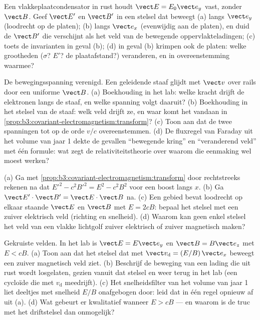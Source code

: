 \begin{exercise}[$\star$]\label{exo:b3:covariant-electromagnetism:4}
Een vlakkeplaatcondensator in rust houdt $\vect E = E_0\vect e_y$ vast,
zonder $\vect B$. Geef $\vect E'$ en $\vect B'$ in een stelsel dat
beweegt (a) langs $\vect e_y$ (loodrecht op de platen); (b) langs $\vect
e_x$ (evenwijdig aan de platen), en duid de $\vect B'$ die verschijnt als
het veld van de bewegende oppervlakteladingen; (c) toets de invarianten in
geval (b); (d) in geval (b) krimpen ook de platen: welke grootheden
($\sigma$? $E'$? de plaatafstand?) veranderen, en in overeenstemming
waarmee?
\end{exercise}

\begin{exercise}[$\star\star$]\label{exo:b3:covariant-electromagnetism:5}
De bewegingsspanning verenigd. Een geleidende staaf glijdt met $\vect v$
over rails door een uniforme $\vect B$. (a) Boekhouding in het lab: welke
kracht drijft de elektronen langs de staaf, en welke spanning volgt
daaruit? (b) Boekhouding in het stelsel van de staaf: welk veld drijft ze,
en waar komt het vandaan in
\cref{prop:b3:covariant-electromagnetism:transform}? (c) Toon aan dat de
twee spanningen tot op de orde $v/c$ overeenstemmen. (d) De fluxregel van
Faraday uit het volume van jaar 1 dekte de gevallen ``bewegende kring'' en
``veranderend veld'' met één formule: wat zegt de relativiteitstheorie
over waarom die eenmaking wel moest werken?
\end{exercise}

\begin{exercise}[$\star\star$]\label{exo:b3:covariant-electromagnetism:6}
(a) Ga met \cref{prop:b3:covariant-electromagnetism:transform} door
rechtstreeks rekenen na dat $E'^2 - c^2B'^2 = E^2 - c^2B^2$ voor een boost
langs $x$. (b) Ga $\vect E'\cdot\vect B' = \vect
E\cdot\vect B$ na. (c)
Een gebied bevat loodrecht op elkaar staande $\vect E$ en $\vect B$ met
$E = 2cB$: bepaal het stelsel met een zuiver elektrisch veld (richting en
snelheid). (d) Waarom kan geen enkel stelsel het veld van een vlakke
lichtgolf zuiver elektrisch of zuiver magnetisch maken?
\end{exercise}

\begin{exercise}[$\star\star$]\label{exo:b3:covariant-electromagnetism:7}
Gekruiste velden. In het lab is $\vect E = E\vect e_y$ en $\vect B =
B\vect e_z$ met $E < cB$. (a) Toon aan dat het stelsel dat met $\vect v_{\text{d}} = (E/B)\,\vect e_x$ beweegt een zuiver magnetisch veld ziet.
(b) Beschrijf de beweging van een lading die uit rust wordt losgelaten,
gezien vanuit dat stelsel en weer terug in het lab (een cycloïde die met
$v_{\text{d}}$ meedrijft). (c) Het snelheidsfilter van het volume van jaar
1 liet deeltjes met snelheid $E/B$ onafgebogen door: leid dat in één regel
opnieuw af uit (a). (d) Wat gebeurt er kwalitatief wanneer $E > cB$ ---
en waarom is de truc met het driftstelsel dan onmogelijk?
\end{exercise}

